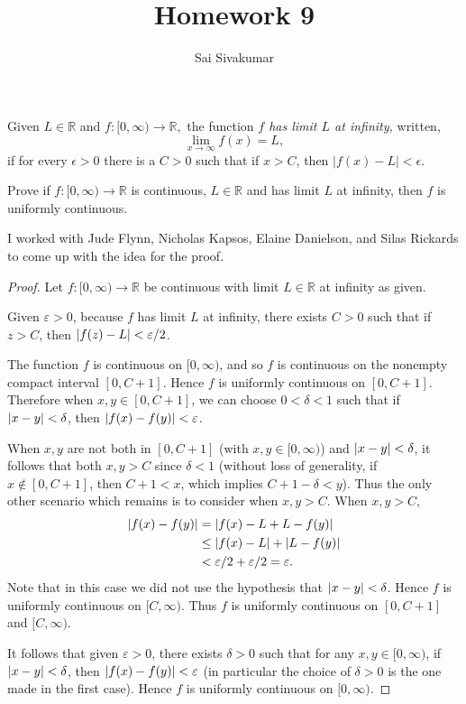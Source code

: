 \documentclass[12pt]{amsart}
\title{Homework 9}
\author{Sai Sivakumar}
\begin{document}
\maketitle

 Given $L\in \mathbb{R}$  and  $f:[0,\infty)\to \mathbb{R},$
  the function  \emph{$f$ has limit $L$ at infinity,}   written,
 \begin{equation*}
   \lim_{x\to \infty}f(x)=L,
 \end{equation*}
  if for every $\epsilon>0$ there is a $C>0$ such that
  if $x>C$, then $|f(x)-L| <\epsilon.$

  Prove if $f:[0,\infty)\to \mathbb{R}$ is continuous, $L\in \mathbb{R}$  and has
  limit $L$  at infinity, then $f$ is uniformly continuous.

  I worked with Jude Flynn, Nicholas Kapsos, Elaine Danielson, and Silas Rickards to come up with the idea for the proof.

\begin{proof}
    Let $f\colon [0,\infty)\to \mathbb{R}$ be continuous with limit $L\in \mathbb{R}$ at infinity as given.

    Given $\varepsilon>0$, because $f$ has limit $L$ at infinity, there exists $C>0$ such that if $z>C$, then $\abs{f(z)-L}< \varepsilon/2$.

    The function $f$ is continuous on $[0,\infty)$, and so $f$ is continuous on the nonempty compact interval $[0,C+1]$. Hence $f$ is uniformly continuous on $[0,C+1]$. Therefore when $x,y\in[0,C+1]$, we can choose $0 < \delta < 1$ such that if $\abs{x-y}< \delta$, then $\abs{f(x)-f(y)}< \varepsilon$.

    When $x,y$ are not both in $[0,C+1]$ (with $x,y\in [0,\infty)$) and $\abs{x-y}<\delta$, it follows that both $x,y > C$ since $\delta < 1$ (without loss of generality, if $x\not\in [0,C+1]$, then $C+1< x$, which implies $C+1-\delta < y$). Thus the only other scenario which remains is to consider when $x,y > C$. When $x,y>C$, \begin{align*}
        \abs{f(x)-f(y)} &= \abs{f(x)-L+L-f(y)}\\
        &\leq \abs{f(x)-L} + \abs{L-f(y)}\\
        &< \varepsilon/2 + \varepsilon/2 = \varepsilon.
    \end{align*} Note that in this case we did not use the hypothesis that $\abs{x-y}< \delta$. Hence $f$ is uniformly continuous on $[C,\infty)$. Thus $f$ is uniformly continuous on $[0,C+1]$ and $[C,\infty)$.
    
    It follows that given $\varepsilon>0$, there exists $\delta >0$ such that for any $x,y\in [0,\infty)$, if $\abs{x-y}< \delta$, then $\abs{f(x)-f(y)} < \varepsilon$ (in particular the choice of $\delta>0$ is the one made in the first case). Hence $f$ is uniformly continuous on $[0,\infty)$.
\end{proof}
\end{document}
